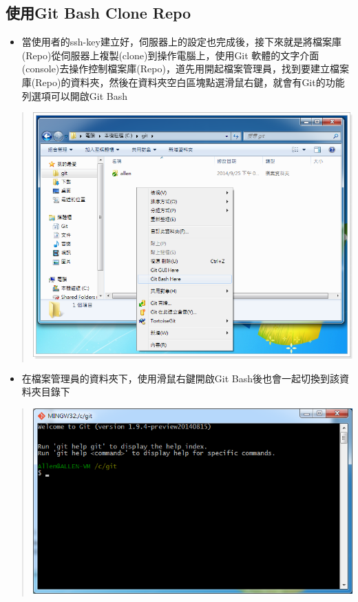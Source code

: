 \documentclass[letterpaper,10pt,english]{sphinxmanual}
\begin{document}
\subsection{使用Git Bash Clone Repo}
\label{_doc/writing/index:git-bash-clone-repo}\begin{itemize}
\item {} 
當使用者的ssh-key建立好，伺服器上的設定也完成後，接下來就是將檔案庫(Repo)從伺服器上複製(clone)到操作電腦上，使用Git 軟體的文字介面(console)去操作控制檔案庫(Repo)，道先用開起檔案管理員，找到要建立檔案庫(Repo)的資料夾，然後在資料夾空白區塊點選滑鼠右鍵，就會有Git的功能列選項可以開啟Git Bash

\end{itemize}
\begin{quote}

\includegraphics{gitbash-clone-001.png}
\end{quote}
\begin{itemize}
\item {} 
在檔案管理員的資料夾下，使用滑鼠右鍵開啟Git Bash後也會一起切換到該資料夾目錄下

\end{itemize}
\begin{quote}

\includegraphics{gitbash-clone-002.png}
\end{quote}
\end{document}
